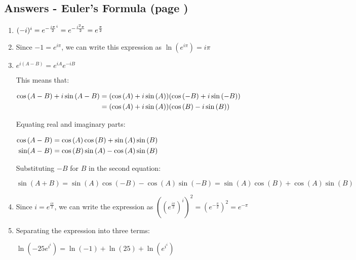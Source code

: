 \documentclass[../main.tex]{subfiles}
\begin{document}
\subsection*{Answers - Euler's Formula (page \pageref{eulersformula})}
\label{Eulers answers}
\begin{spacing}{1.5}
\begin{enumerate}
    \item 
    \((-i)^i=e^{-\frac{i\pi}{2}^{i}}\\
    =e^{-\frac{i^2 \pi}{2}}\\
    =e^{\frac{\pi}{2}}\)

    \item 
    Since \(-1=e^{i \pi}\), we can write this expression as \(\ln{(e^{i \pi})}=i \pi\)

    \item 
    \(e^{i(A-B)}=e^{iA}e^{-iB}\)

    This means that:

    $
    \!
    \begin{aligned}[t]
    \cos{(A-B)+i\sin{(A-B)}}
    &=(\cos{(A)+i\sin{(A)}})(\cos{(-B)+i\sin{(-B)}})\\
    &=(\cos{(A)+i\sin{(A)}})(\cos{(B)-i\sin{(B)}})
    \end{aligned}\\
    $
    
    Equating real and imaginary parts:

    $
    \!
    \begin{aligned}[t]
    \cos{(A-B)}
    &=\cos{(A)}\cos{(B)}+\sin{(A)}\sin{(B)}\\
    \sin(A-B)
    &=\cos{(B)}\sin{(A)}-\cos{(A)}\sin{(B)}\\
    \end{aligned}\\
    $

    Substituting \(-B\) for \(B\) in the second equation:

    \(\sin{(A+B)}=\sin{(A)}\cos{(-B)}-\cos{(A)}\sin{(-B)}=\sin{(A)}\cos{(B)}+\cos{(A)}\sin{(B)}\)

    \item 
    Since \(i=e^{\frac{i \pi}{2}}\), we can write the expression as \(((e^{\frac{i \pi}{2}})^i)^2=(e^{-\frac{\pi}{2}})^2=e^{-\pi}\)

    \item 
    Separating the expression into three terms:

    \(\ln{(-25e^{i^{i}})}=\ln(-1)+\ln(25)+\ln(e^{i^{i}})\)


\end{enumerate}
\end{spacing}
\end{document}
